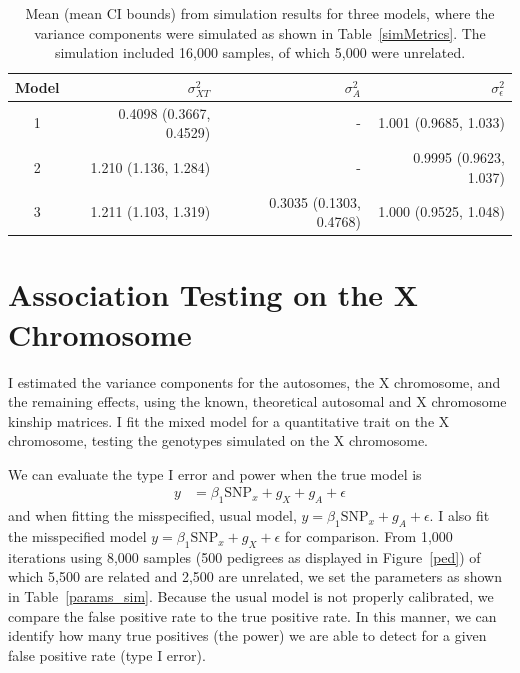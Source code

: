 \documentclass[11pt]{article} %
\newcommand{\snpX}{\mbox{SNP}_x}
\begin{document}
\bgroup
\def\arraystretch{1.5}
\begin{table}[ht]
\centering
\begin{tabular}{crrr}
  \hline
 Model & $\sigma^2_{XT}$ &  $\sigma^2_A$& $\sigma^2_\epsilon$  \\ 
  \hline
1 & 0.4098 (0.3667, 0.4529)& -  & 1.001 (0.9685, 1.033)  \\
2 &1.210 (1.136, 1.284)& - & 0.9995 (0.9623, 1.037) \\
3 & 1.211 (1.103, 1.319) & 0.3035 (0.1303, 0.4768) & 1.000 (0.9525, 1.048)\\ 
   \hline
\end{tabular}
\caption{Mean (mean CI bounds) from simulation results for three models, where the variance components were simulated as shown in Table~\ref{simMetrics}. The simulation included 16,000 samples, of which 5,000 were unrelated.} \label{varComp_sim_results}
\end{table}



\section*{Association Testing on the X Chromosome}
I estimated the variance components for the autosomes, the X chromosome, and the remaining effects, using the known, theoretical autosomal and X chromosome kinship matrices.
I fit the mixed model for a quantitative trait on the X chromosome, testing the genotypes simulated on the X chromosome.

We can evaluate the type I error and power when the true model is 
\begin{align}
 y&=\beta_1 \snpX + g_X + g_A + \epsilon 
\end{align}
and when fitting the misspecified, usual model, $y=\beta_1 \snpX + g_A + \epsilon$. I also fit the 
misspecified model $y=\beta_1 \snpX + g_X + \epsilon$ for comparison.
From 1,000 iterations using 8,000 samples (500 pedigrees as displayed in Figure~\ref{ped}) of which 5,500 are related and 2,500 are unrelated, we set the 
parameters as shown in Table~\ref{params_sim}.
Because the usual model is not properly calibrated, we compare the false positive rate to the true positive rate.
In this manner, we can identify how many true positives (the power) we are able to detect for a given false positive rate (type I error). 
\end{document}
